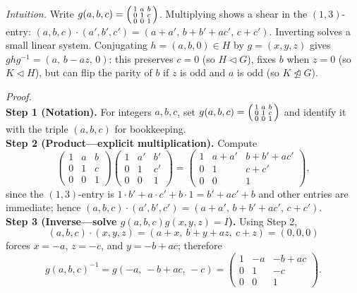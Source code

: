\documentclass[12pt]{article}
\theoremstyle{definition}
\begin{document}
\newpage

\dotfill

\emph{Intuition.} Write $g(a,b,c)=\begin{psmallmatrix}1&a&b\\0&1&c\\0&0&1\end{psmallmatrix}$. Multiplying shows a shear in the $(1,3)$-entry: $(a,b,c)\cdot(a',b',c')=(a+a',\,b+b'+ac',\,c+c')$. Inverting solves a small linear system. Conjugating $h=(a,b,0)\in H$ by $g=(x,y,z)$ gives $ghg^{-1}=(a,\,b-az,\,0)$: this preserves $c=0$ (so $H\lhd G$), fixes $b$ when $z=0$ (so $K\lhd H$), but can flip the parity of $b$ if $z$ is odd and $a$ is odd (so $K\ntrianglelefteq G$).\\

\dotfill

\emph{Proof.}\\
\textbf{Step 1 (Notation).} For integers $a,b,c$, set $g(a,b,c)=\begin{psmallmatrix}1&a&b\\0&1&c\\0&0&1\end{psmallmatrix}$ and identify it with the triple $(a,b,c)$ for bookkeeping.\\
\textbf{Step 2 (Product—explicit multiplication).} Compute
\[
\begin{pmatrix}
1 & a & b\\
0 & 1 & c\\
0 & 0 & 1
\end{pmatrix}
\begin{pmatrix}
1 & a' & b'\\
0 & 1 & c'\\
0 & 0 & 1
\end{pmatrix}
=
\begin{pmatrix}
1 & a+a' & b+b'+ac'\\
0 & 1 & c+c'\\
0 & 0 & 1
\end{pmatrix},
\]
since the $(1,3)$-entry is $1\cdot b'+a\cdot c'+b\cdot 1=b'+ac'+b$ and other entries are immediate; hence $(a,b,c)\cdot(a',b',c')=(a+a',\,b+b'+ac',\,c+c')$.\\
\textbf{Step 3 (Inverse—solve $g(a,b,c)g(x,y,z)=I$).} Using Step 2,
\[
(a,b,c)\cdot(x,y,z)=(a+x,\ b+y+az,\ c+z)=(0,0,0)
\]
forces $x=-a$, $z=-c$, and $y=-b+ac$; therefore
\[
g(a,b,c)^{-1}=g(-a,\,-b+ac,\,-c)=\begin{pmatrix}1&-a&-b+ac\\0&1&-c\\0&0&1\end{pmatrix}.
\]\\
\end{document}
